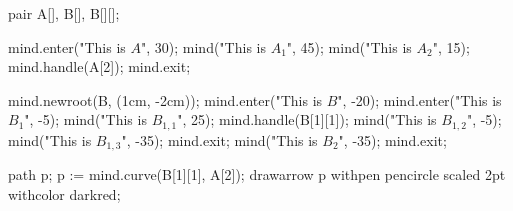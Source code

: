 \usemodule[mindmap]
\startMPpage
pair A[], B[], B[][];

mind.enter("This is $A$", 30);
    mind("This is $A_1$", 45);
    mind("This is $A_2$", 15); mind.handle(A[2]);
mind.exit;

mind.newroot(B, (1cm, -2cm));
mind.enter("This is $B$", -20);
    mind.enter("This is $B_{1}$", -5);
        mind("This is $B_{1,1}$", 25); mind.handle(B[1][1]);
        mind("This is $B_{1,2}$", -5);
        mind("This is $B_{1,3}$", -35);
    mind.exit;
    mind("This is $B_2$", -35);
mind.exit;

path p; p := mind.curve(B[1][1], A[2]);
drawarrow p withpen pencircle scaled 2pt withcolor darkred;
\stopMPpage
